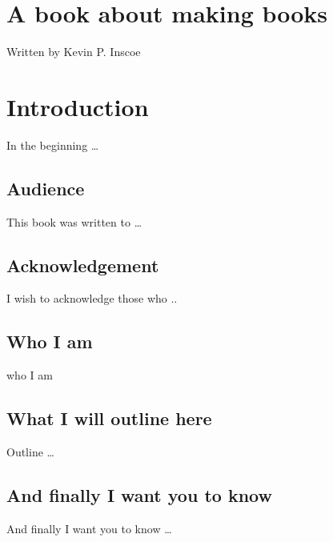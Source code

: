 \chapter*{A book about making books}\label{a-book-about-making-books}

Written by Kevin P. Inscoe

\chapter*{Introduction}\label{introduction}

In the beginning \ldots{}

\section*{Audience}\label{audience}

This book was written to \ldots{}

\section*{Acknowledgement}\label{acknowledgement}

I wish to acknowledge those who ..

\section*{Who I am}\label{who-i-am}

who I am

\section*{What I will outline here}\label{what-i-will-outline-here}

Outline \ldots{}

\section*{And finally I want you to
know}\label{and-finally-i-want-you-to-know}

And finally I want you to know \ldots{}

